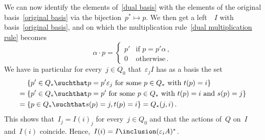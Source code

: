 \begin{remark*}
\begin{enumerate}
      We can now identify the elements of~\eqref{dual basis} with the elements of the original basis~\eqref{original basis} via the bijection~$p^* \mapsto p$.
      We then get a left~{}~$I$ with basis~\eqref{original basis}, and on which the multiplication rule~\eqref{dual multiplication rule} becomes
      \[
        \alpha \cdot p
        =
        \begin{cases}
          p'  & \text{if~$p = p' \alpha$} \,, \\
          0   & \text{otherwise}  \,.
        \end{cases}
      \]
      We have in particular for every~$j \in Q_0$ that~$\varepsilon_j I$ has as a basis the set
      \begin{align*}
        {}&
        \{
          p' \in Q_*
        \suchthat
          \text{$p = p' \varepsilon_j$ for some~$p \in Q_*$ with~$t(p) = i$}
        \}
        \\
        ={}&
        \{
          p' \in Q_*
        \suchthat
          \text{$p = p'$ for some~$p \in Q_*$ with~$t(p) = i$ and~$s(p) = j$}
        \}
        \\
        ={}&
        \{
          p \in Q_*
        \suchthat
          s(p) = j,
          t(p) = i
        \}
        =
        Q_*(j,i)  \,.
      \end{align*}
      This shows that~$I_j = I(i)_j$ for every~$j \in Q_0$ and that the actions of~$Q$ on~$I$ and~$I(i)$ coincide.
      Hence,~$I(i) = I \inclusion (\varepsilon_i A)^*$.
  \end{enumerate}
\end{remark*}




